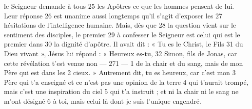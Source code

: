 le Seigneur demande à tous	 
25	 	les Apôtres ce que les hommes pensent de lui. Leur réponse	 
26	 	est unanime aussi longtemps qu'il s'agit d'exposer les	 
27	 	hésitations de l'intelligence humaine. Mais, dès que	 
28	 	la question vient sur le sentiment des disciples, le premier	 
29	 	à confesser le Seigneur est celui qui est le premier dans	 
30	 	la dignité d'apôtre. Il avait dit : « Tu es le Christ, le Fils	 
31	 	du Dieu vivant », Jésus lui répond : « Heureux es-tu,	 
32	 	Simon, fils de Jonas, car cette révélation t'est venue non	 
 	--- 271 ---	 
1	 	de la chair et du sang, mais de mon Père qui est dans les	 
2	 	cieux. » Autrement dit, tu es heureux, car c'est mon	 
3	 	Père qui t'a enseigné et ce n'est pas une opinion de la terre	 
4	 	qui t'aurait trompé, mais c'est une inspiration du ciel	 
5	 	qui t'a instruit ; et ni la chair ni le sang ne m'ont désigné	 
6	 	à toi, mais celui-là dont je suis l'unique engendré.